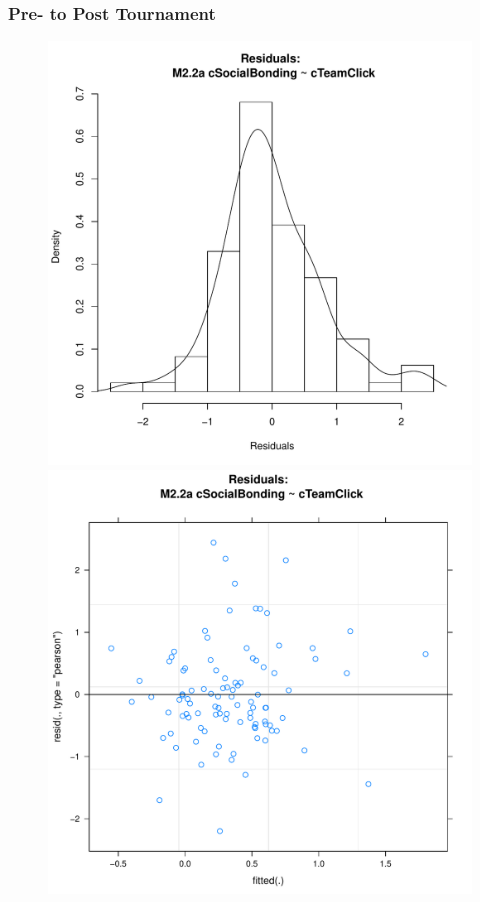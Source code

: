 \begin{CJK}{UTF8}{gbsn}
      \subsubsection{Pre- to Post Tournament}


      

      \begin{figure}[htbp]
        \includegraphics[scale =.4]{images/MLM22aHist.pdf}
        \includegraphics[scale =.4]{images/MLM22aScatter.pdf}

\end{figure}
\end{CJK}
